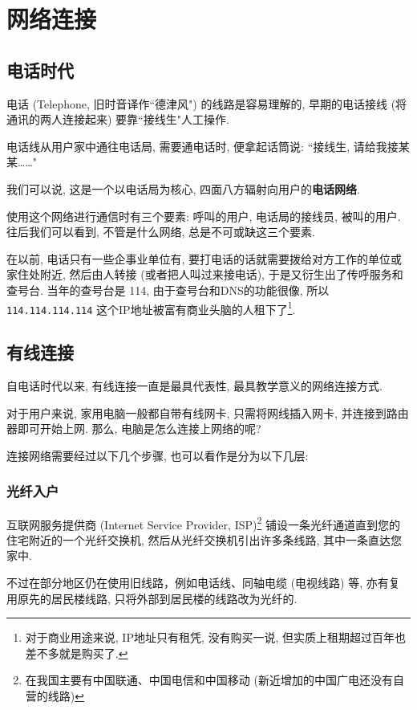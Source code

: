 \chapter{网络连接}

\section{电话时代}

电话 (Telephone, 旧时音译作``德津风") 的线路是容易理解的, 早期的电话接线 (将通讯的两人连接起来) 要靠``接线生"人工操作.

电话线从用户家中通往电话局, 需要通电话时, 便拿起话筒说: ``接线生, 请给我接某某\dots\dots"

我们可以说, 这是一个以电话局为核心, 四面八方辐射向用户的\textbf{电话网络}.

使用这个网络进行通信时有三个要素: 呼叫的用户, 电话局的接线员, 被叫的用户. 往后我们可以看到, 不管是什么网络, 总是不可或缺这三个要素.

在以前, 电话只有一些企事业单位有, 要打电话的话就需要拨给对方工作的单位或家住处附近, 然后由人转接 (或者把人叫过来接电话), 于是又衍生出了传呼服务和查号台. 当年的查号台是 114, 由于查号台和DNS的功能很像, 所以 \verb|114.114.114.114| 这个IP地址被富有商业头脑的人租下了\footnote{对于商业用途来说, IP地址只有租凭, 没有购买一说, 但实质上租期超过百年也差不多就是购买了.}.

\section{有线连接}

自电话时代以来, 有线连接一直是最具代表性, 最具教学意义的网络连接方式.

对于用户来说, 家用电脑一般都自带有线网卡, 只需将网线插入网卡, 并连接到路由器即可开始上网. 那么, 电脑是怎么连接上网络的呢?

连接网络需要经过以下几个步骤, 也可以看作是分为以下几层:

\subsection{光纤入户}

互联网服务提供商 (Internet Service Provider, ISP)\footnote{在我国主要有中国联通、中国电信和中国移动 (新近增加的中国广电还没有自营的线路)} 铺设一条光纤通道直到您的住宅附近的一个光纤交换机, 然后从光纤交换机引出许多条线路, 其中一条直达您家中.

不过在部分地区仍在使用旧线路，例如电话线、同轴电缆 (电视线路) 等, 亦有复用原先的居民楼线路, 只将外部到居民楼的线路改为光纤的.

